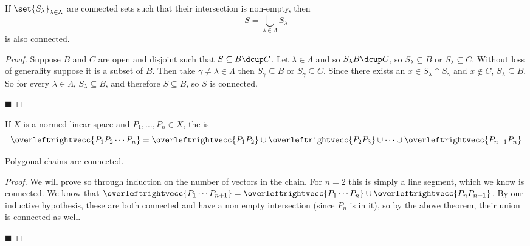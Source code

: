 \documentclass[10pt]{article}
\let\lineseg=\overleftrightvecc
\begin{document}
\begin{thrm*}

    If $\set{S_\lambda}_{\lambda\in\Lambda}$ are connected sets such that their intersection is non-empty, then
    \[ S = \bigcup_{\lambda\in\Lambda} S_\lambda \]
    is also connected.

\end{thrm*}

\begin{proof}

    Suppose $B$ and $C$ are open and disjoint such that $S\subseteq B\dcup C$.
    Let $\lambda\in\Lambda$ and so $S_\lambda B\dcup C$, so $S_\lambda\subseteq B$ or $S_\lambda\subseteq C$.
    Without loss of generality suppose it is a subset of $B$.
    Then take $\gamma\neq\lambda\in\Lambda$ then $S_\gamma\subseteq B$ or $S_\gamma\subseteq C$.
    Since there exists an $x\in S_\lambda\cap S_\gamma$ and $x\notin C$, $S_\lambda\subseteq B$.
    So for every $\lambda\in\Lambda$, $S_\lambda\subseteq B$, and therefore $S\subseteq B$, so $S$ is connected.

    \hfill$\blacksquare$

\end{proof}

\begin{defn*}

    If $X$ is a normed linear space and $P_1,\dots,P_n\in X$, the  is
    \[ \lineseg{P_1P_2\cdots P_n} = \lineseg{P_1P_2}\cup\lineseg{P_2P_3}\cup\cdots\cup\lineseg{P_{n-1}P_n} \]

\end{defn*}

\begin{prop*}

    Polygonal chains are connected.

\end{prop*}

\begin{proof}

    We will prove so through induction on the number of vectors in the chain.
    For $n=2$ this is simply a line segment, which we know is connected.
    We know that $\lineseg{P_1\cdots P_{n+1}} = \lineseg{P_1\cdots P_n}\cup\lineseg{P_nP_{n+1}}$.
    By our inductive hypothesis, these are both connected and have a non empty intersection (since $P_n$ is in it), so by the above
    theorem, their union is connected as well.

    \hfill$\blacksquare$

\end{proof}
\end{document}
